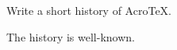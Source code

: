 \item{} Write a short history of Acro\negthinspace\TeX.\par
\RespBoxEssay*{\linewidth}{1in}
\begin{solution}
The history is well-known.
\end{solution}
